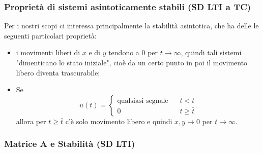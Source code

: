 \subsubsection{Proprietà di sistemi asintoticamente stabili (SD LTI a TC)}
Per i nostri scopi ci interessa principalmente la stabilità asintotica, che ha delle le seguenti particolari proprietà:
\begin{itemize}
    \item i movimenti liberi di $x$ e di $y$ tendono a $0$ per $t \rightarrow  \infty$, quindi tali sistemi "dimenticano lo stato iniziale", cioè da un certo punto in poi il movimento libero diventa trascurabile;
    \item Se 
    \[
        u(t) = \begin{cases}
            \text{qualsiasi segnale}\; \;\; & t< \bar{t}\\
            0 & t \geq \bar{t}
        \end{cases}
    \]
    allora per $t \geq \bar{t}$ c'è solo movimento libero e quindi $x,y \rightarrow 0$ per $t \rightarrow \infty$.
\end{itemize}
\subsubsection{Matrice A e Stabilità (SD LTI)}
